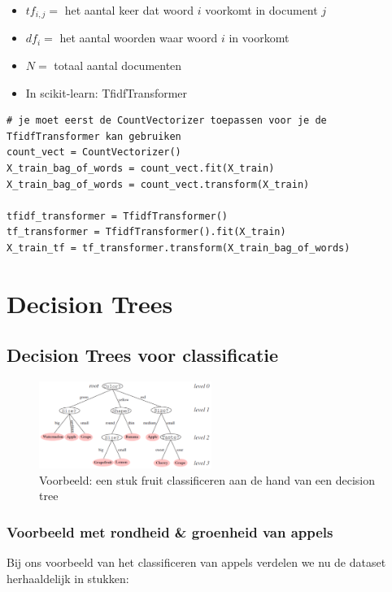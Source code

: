 \documentclass{article}
\begin{document}
\begin{itemize}
    \item $tf_{i,j} =$ het aantal keer dat woord $i$ voorkomt in document $j$
    \item $df_i =$ het aantal woorden waar woord $i$ in voorkomt
    \item $N=$ totaal aantal documenten
    \item In scikit-learn: TfidfTransformer
\end{itemize}

\begin{verbatim}
# je moet eerst de CountVectorizer toepassen voor je de TfidfTransformer kan gebruiken
count_vect = CountVectorizer()
X_train_bag_of_words = count_vect.fit(X_train)
X_train_bag_of_words = count_vect.transform(X_train)

tfidf_transformer = TfidfTransformer()
tf_transformer = TfidfTransformer().fit(X_train)
X_train_tf = tf_transformer.transform(X_train_bag_of_words)
\end{verbatim}

\section{Decision Trees}
\subsection{Decision Trees voor classificatie}

\begin{figure}[H]
    \centering
    \includegraphics[width=0.5\textwidth]{decision-tree.png}
    \caption{Voorbeeld: een stuk fruit classificeren aan de hand van een decision tree}
\end{figure}

\subsubsection{Voorbeeld met rondheid \& groenheid van appels}


Bij ons voorbeeld van het classificeren van appels verdelen we nu de dataset herhaaldelijk in stukken:
\end{document}
